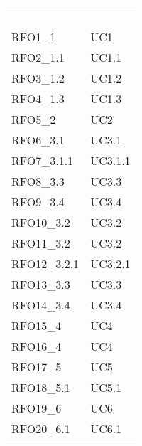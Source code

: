 \renewcommand{\arraystretch}{1.5}


\begin{longtable}{|C{6cm} C{3cm}|} 
	
	\textcolor{white}{\textbf{Requisiti}} &
	\textcolor{white}{\textbf{Fonte}} \\
	
	RFO1\_1 & UC1 \\

	RFO2\_1.1 & UC1.1 \\
	
	RFO3\_1.2 & UC1.2 \\
	
	RFO4\_1.3 & UC1.3 \\
	
	RFO5\_2 & UC2 \\

	RFO6\_3.1 & UC3.1 \\
	
	RFO7\_3.1.1 & UC3.1.1 \\

	RFO8\_3.3 & UC3.3 \\

	RFO9\_3.4 & UC3.4 \\

	RFO10\_3.2 & UC3.2 \\
	
	RFO11\_3.2 & UC3.2 \\
	
	RFO12\_3.2.1 & UC3.2.1 \\

	RFO13\_3.3 & UC3.3 \\

	RFO14\_3.4 & UC3.4 \\

    RFO15\_4 & UC4 \\
    
    RFO16\_4 & UC4 \\

    RFO17\_5 & UC5 \\
    
    RFO18\_5.1 & UC5.1 \\
    
    RFO19\_6 & UC6\\
    
    RFO20\_6.1 & UC6.1 \\
    

\end{longtable}
